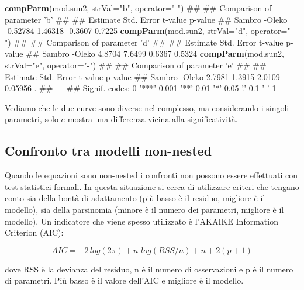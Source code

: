 \documentclass[a4paper,12pt,oneside]{book}
\newenvironment{Shaded}{\begin{snugshade}}{\end{snugshade}}
\newcommand{\KeywordTok}[1]{\textcolor[rgb]{0.13,0.29,0.53}{\textbf{#1}}}
\newcommand{\DataTypeTok}[1]{\textcolor[rgb]{0.13,0.29,0.53}{#1}}
\newcommand{\StringTok}[1]{\textcolor[rgb]{0.31,0.60,0.02}{#1}}
\newcommand{\NormalTok}[1]{#1}
\theoremstyle{definition}
\theoremstyle{definition}
\theoremstyle{definition}
\theoremstyle{remark}
\begin{document}
\begin{Shaded}
\begin{Highlighting}[]
\KeywordTok{compParm}\NormalTok{(mod.sun2, }\DataTypeTok{strVal=}\StringTok{"b"}\NormalTok{, }\DataTypeTok{operator=}\StringTok{"-"}\NormalTok{)}
\NormalTok{## }
\NormalTok{## Comparison of parameter 'b' }
\NormalTok{## }
\NormalTok{##                Estimate Std. Error t-value p-value}
\NormalTok{## Sambro -Oleko  -0.52784    1.46318 -0.3607  0.7225}
\KeywordTok{compParm}\NormalTok{(mod.sun2, }\DataTypeTok{strVal=}\StringTok{"d"}\NormalTok{, }\DataTypeTok{operator=}\StringTok{"-"}\NormalTok{)}
\NormalTok{## }
\NormalTok{## Comparison of parameter 'd' }
\NormalTok{## }
\NormalTok{##                Estimate Std. Error t-value p-value}
\NormalTok{## Sambro -Oleko    4.8704     7.6499  0.6367  0.5324}
\KeywordTok{compParm}\NormalTok{(mod.sun2, }\DataTypeTok{strVal=}\StringTok{"e"}\NormalTok{, }\DataTypeTok{operator=}\StringTok{"-"}\NormalTok{)}
\NormalTok{## }
\NormalTok{## Comparison of parameter 'e' }
\NormalTok{## }
\NormalTok{##                Estimate Std. Error t-value p-value  }
\NormalTok{## Sambro -Oleko    2.7981     1.3915  2.0109 0.05956 .}
\NormalTok{## ---}
\NormalTok{## Signif. codes:  0 '***' 0.001 '**' 0.01 '*' 0.05 '.' 0.1 ' ' 1}
\end{Highlighting}
\end{Shaded}

Vediamo che le due curve sono diverse nel complesso, ma considerando i
singoli parametri, solo \(e\) mostra una differenza vicina alla
significatività.

\subsection{Confronto tra modelli
non-nested}\label{confronto-tra-modelli-non-nested}

Quando le equazioni sono non-nested i confronti non possono essere
effettuati con test statistici formali. In questa situazione si cerca di
utilizzare criteri che tengano conto sia della bontà di adattamento (più
basso è il residuo, migliore è il modello), sia della parsinomia (minore
è il numero dei parametri, migliore è il modello). Un indicatore che
viene spesso utilizzato è l'AKAIKE Information Criterion (AIC):

\[ AIC =  - 2 \, log(2\pi ) + n\,\, log(RSS/n) + n + 2(p + 1) \]

dove RSS è la devianza del residuo, n è il numero di osservazioni e p è
il numero di parametri. Più basso è il valore dell'AIC e migliore è il
modello.
\end{document}
